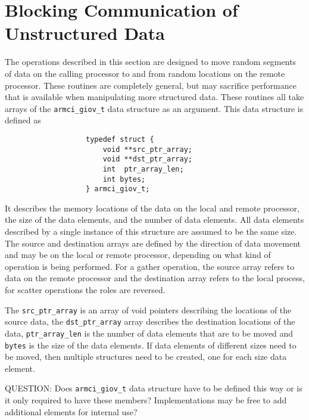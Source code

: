 \documentclass[12pt]{article}
\begin{document}
\section{Blocking Communication of Unstructured Data}
The operations described in this section are designed to move random segments of
data on the calling processor to and from random locations on the remote
processor. These routines are completely general, but may sacrifice performance
that is available when manipulating more structured data. These routines all
take arrays of the \texttt{armci\_giov\_t} data structure as an argument.
This data structure is defined as
\begin{verbatim}
                   typedef struct {
                       void **src_ptr_array;
                       void **dst_ptr_array;
                       int  ptr_array_len;
                       int bytes;
                   } armci_giov_t;
\end{verbatim}
It describes the memory locations of the data on the local and remote processor,
the size of the data elements, and the number of data elements. All data
elements described by a single instance of this structure are assumed to be the
same size. The source and destination arrays are defined by the direction of
data movement and may be on the local or remote processor, depending on what
kind of operation is being performed. For a gather operation, the source array
refers to data on the remote processor and the destination array refers to the
local process, for scatter operations the roles are reversed.

The \texttt{src\_ptr\_array} is an array of void pointers describing the
locations of the source data, the \texttt{dst\_ptr\_array} array describes the
destination locations of the data, \texttt{ptr\_array\_len} is the number of
data elements that are to be moved and \texttt{bytes} is the size of the data
elements. If data elements of different sizes need to be moved, then multiple
structures need to be created, one for each size data element.

QUESTION: Does \texttt{armci\_giov\_t} data structure have to be defined this
way or is it only required to have these members? Implementations may be free to
add additional elements for internal use?
\end{document}

